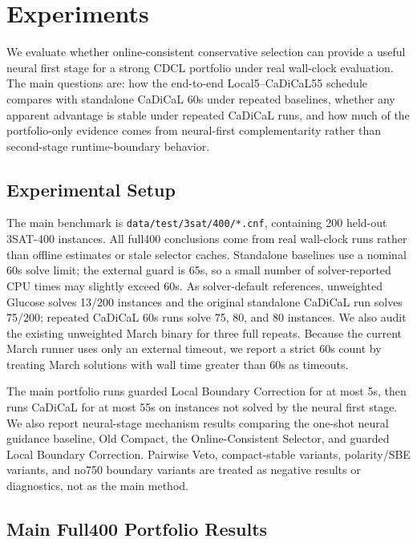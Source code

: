 \documentclass[11pt]{article}
\begin{document}
\section{Experiments}

We evaluate whether online-consistent conservative selection can provide a useful neural first stage for a strong CDCL portfolio under real wall-clock evaluation. The main questions are: how the end-to-end Local5--CaDiCaL55 schedule compares with standalone CaDiCaL 60s under repeated baselines, whether any apparent advantage is stable under repeated CaDiCaL runs, and how much of the portfolio-only evidence comes from neural-first complementarity rather than second-stage runtime-boundary behavior.

\subsection{Experimental Setup}

The main benchmark is \texttt{data/test/3sat/400/*.cnf}, containing 200 held-out 3SAT-400 instances. All full400 conclusions come from real wall-clock runs rather than offline estimates or stale selector caches. Standalone baselines use a nominal 60s solve limit; the external guard is 65s, so a small number of solver-reported CPU times may slightly exceed 60s. As solver-default references, unweighted Glucose solves 13/200 instances and the original standalone CaDiCaL run solves 75/200; repeated CaDiCaL 60s runs solve 75, 80, and 80 instances. We also audit the existing unweighted March binary for three full repeats. Because the current March runner uses only an external timeout, we report a strict 60s count by treating March solutions with wall time greater than 60s as timeouts.

The main portfolio runs guarded Local Boundary Correction for at most 5s, then runs CaDiCaL for at most 55s on instances not solved by the neural first stage. We also report neural-stage mechanism results comparing the one-shot neural guidance baseline, Old Compact, the Online-Consistent Selector, and guarded Local Boundary Correction. Pairwise Veto, compact-stable variants, polarity/SBE variants, and no750 boundary variants are treated as negative results or diagnostics, not as the main method.

\subsection{Main Full400 Portfolio Results}
\end{document}
